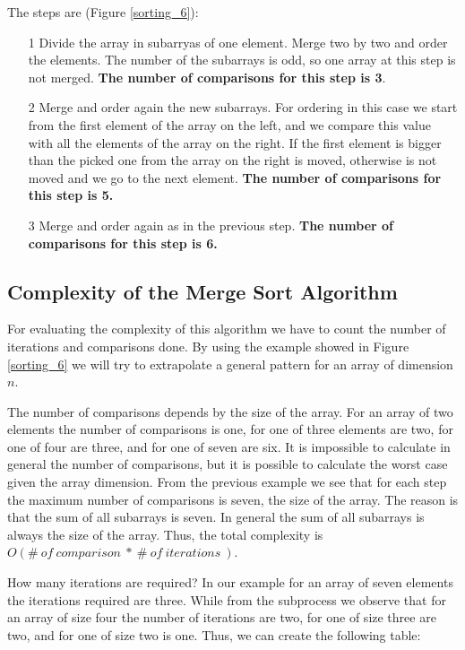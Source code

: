The steps are (Figure \ref{sorting_6}): 
\begin{itemize}
\item[1] Divide the array in subarryas of one element. Merge two by two and order the elements. The number of the subarrays is odd, so one array at this step is not merged. \textbf{The number of comparisons for this step is 3}.
\item[2] Merge and order again the new subarrays. For ordering in this case we start from the first element of the array on the left, and we compare this value with all the elements of the array on the right. If the first element is bigger than the picked one from the array on the right is moved, otherwise is not moved and we go to the next element. \textbf{The number of comparisons for this step is 5.}   
\item[3] Merge and order again as in the previous step. \textbf{The number of comparisons for this step is 6.}
\end{itemize}

\subsection{Complexity of the Merge Sort Algorithm}
For evaluating the complexity of this algorithm we have to count the number of iterations and comparisons done. By using the example showed in Figure \ref{sorting_6} we will try to extrapolate a general pattern for an array of dimension \(n\).

The number of comparisons depends by the size of the array. For an array of two elements the number of comparisons is one, for one of three elements are two, for one of four are three, and for one of seven are six. It is impossible to calculate in general the number of comparisons, but it is possible to calculate the worst case given the array dimension. From the previous example we see that for each step the maximum number of comparisons is seven, the size of the array. The reason is that the sum of all subarrays is seven. In general the sum of all subarrays is always the size of the array. Thus, the total complexity is \(O(\# \ of\ comparison \ * \ \# \ of \ iterations \ )\).

How many iterations are required? In our example for an array of seven elements the iterations required are three. While from the subprocess we observe that for an array of size four the number of iterations are two, for one of size three are two, and for one of size two is one. Thus, we can create the following table:

